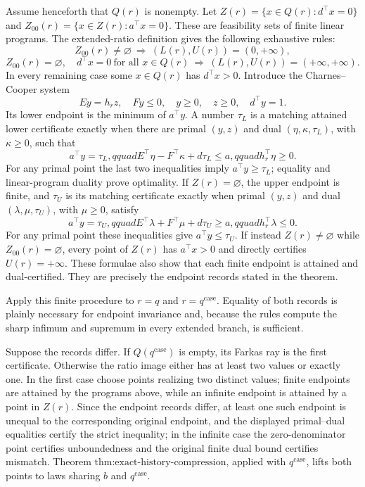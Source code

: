 Assume henceforth that \(Q(r)\) is nonempty.  Let \(Z(r)=\{x\in Q(r):d^\top x=0\}\) and \(Z_{00}(r)=\{x\in Z(r):a^\top x=0\}\).  These are feasibility sets of finite linear programs.  The extended-ratio definition gives the following exhaustive rules:
\[
Z_{00}(r)\ne\varnothing\ \Longrightarrow\ (L(r),U(r))=(0,+\infty),
\]
\[
Z_{00}(r)=\varnothing,\quad d^\top x=0\ \text{for all }x\in Q(r)
\ \Longrightarrow\ (L(r),U(r))=(+\infty,+\infty).
\]
In every remaining case some \(x\in Q(r)\) has \(d^\top x>0\).  Introduce the Charnes--Cooper system
\[
Ey=h_rz,\quad Fy\leq0,\quad y\geq0,\quad z\geq0,
\quad d^\top y=1.
\]
Its lower endpoint is the minimum of \(a^\top y\).  A number \(\tau_L\) is a matching attained lower certificate exactly when there are primal \((y,z)\) and dual \((\eta,\kappa,\tau_L)\), with \(\kappa\geq0\), such that
\[
a^\top y=\tau_L,qquad
E^\top\eta-F^\top\kappa+d\tau_L\leq a,qquad
h_r^\top\eta\geq0.
\]
For any primal point the last two inequalities imply \(a^\top y\geq\tau_L\); equality and linear-program duality prove optimality.  If \(Z(r)=\varnothing\), the upper endpoint is finite, and \(\tau_U\) is its matching certificate exactly when primal \((y,z)\) and dual \((\lambda,\mu,\tau_U)\), with \(\mu\geq0\), satisfy
\[
a^\top y=\tau_U,qquad
E^\top\lambda+F^\top\mu+d\tau_U\geq a,qquad
h_r^\top\lambda\leq0.
\]
For any primal point these inequalities give \(a^\top y\leq\tau_U\).  If instead \(Z(r)\ne\varnothing\) while \(Z_{00}(r)=\varnothing\), every point of \(Z(r)\) has \(a^\top x>0\) and directly certifies \(U(r)=+\infty\).  These formulae also show that each finite endpoint is attained and dual-certified.  They are precisely the endpoint records stated in the theorem.

Apply this finite procedure to \(r=q\) and \(r=q^{\mathrm{case}}\).  Equality of both records is plainly necessary for endpoint invariance and, because the rules compute the sharp infimum and supremum in every extended branch, is sufficient.

Suppose the records differ.  If \(Q(q^{\mathrm{case}})\) is empty, its Farkas ray is the first certificate.  Otherwise the ratio image either has at least two values or exactly one.  In the first case choose points realizing two distinct values; finite endpoints are attained by the programs above, while an infinite endpoint is attained by a point in \(Z(r)\).  Since the endpoint records differ, at least one such endpoint is unequal to the corresponding original endpoint, and the displayed primal--dual equalities certify the strict inequality; in the infinite case the zero-denominator point certifies unboundedness and the original finite dual bound certifies mismatch.  Theorem \(\text{thm:exact-history-compression}\), applied with \(q^{\mathrm{case}}\), lifts both points to laws sharing \(b\) and \(q^{\mathrm{case}}\).

